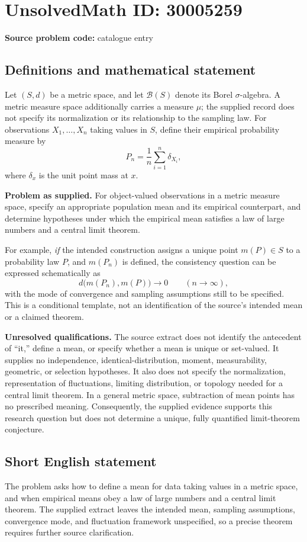 \documentclass[11pt]{article}
\begin{document}
\section*{UnsolvedMath ID: 30005259}
\textbf{Source problem code:} catalogue entry
\subsection{Definitions and mathematical statement}
Let \((S,d)\) be a metric space, and let \(\mathcal B(S)\) denote its Borel \(\sigma\)-algebra. A metric measure space additionally carries a measure \(\mu\); the supplied record does not specify its normalization or its relationship to the sampling law. For observations \(X_1,\ldots,X_n\) taking values in \(S\), define their empirical probability measure by
\[
P_n=\frac1n\sum_{i=1}^n\delta_{X_i},
\]
where \(\delta_x\) is the unit point mass at \(x\).

\textbf{Problem as supplied.} For object-valued observations in a metric measure space, specify an appropriate population mean and its empirical counterpart, and determine hypotheses under which the empirical mean satisfies a law of large numbers and a central limit theorem.

For example, \emph{if} the intended construction assigns a unique point \(m(P)\in S\) to a probability law \(P\), and \(m(P_n)\) is defined, the consistency question can be expressed schematically as
\[
d\bigl(m(P_n),m(P)\bigr)\longrightarrow 0
\qquad(n\longrightarrow\infty),
\]
with the mode of convergence and sampling assumptions still to be specified. This is a conditional template, not an identification of the source's intended mean or a claimed theorem.

\textbf{Unresolved qualifications.} The source extract does not identify the antecedent of ``it,'' define a mean, or specify whether a mean is unique or set-valued. It supplies no independence, identical-distribution, moment, measurability, geometric, or selection hypotheses. It also does not specify the normalization, representation of fluctuations, limiting distribution, or topology needed for a central limit theorem. In a general metric space, subtraction of mean points has no prescribed meaning. Consequently, the supplied evidence supports this research question but does not determine a unique, fully quantified limit-theorem conjecture.
\subsection{Short English statement}
The problem asks how to define a mean for data taking values in a metric space, and when empirical means obey a law of large numbers and a central limit theorem. The supplied extract leaves the intended mean, sampling assumptions, convergence mode, and fluctuation framework unspecified, so a precise theorem requires further source clarification.
\end{document}

